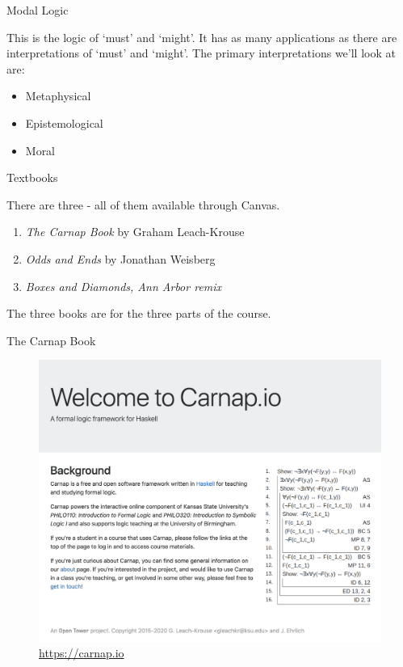 \documentclass[
  ignorenonframetext,
]{beamer}
\providecommand{\tightlist}{%
  \setlength{\itemsep}{0pt}\setlength{\parskip}{0pt}}
\renewcommand{\,}{\text{, }}
\begin{document}
\begin{frame}{Modal Logic}
\protect\hypertarget{modal-logic}{}

This is the logic of `must' and `might'. It has as many applications as
there are interpretations of `must' and `might'. The primary
interpretations we'll look at are:

\begin{itemize}[<+->]
\tightlist
\item
  Metaphysical
\item
  Epistemological\\
\item
  Moral
\end{itemize}

\end{frame}

\begin{frame}{Textbooks}
\protect\hypertarget{textbooks}{}

There are three - all of them available through Canvas.

\begin{enumerate}
\tightlist
\item
  \emph{The Carnap Book} by Graham Leach-Krouse
\item
  \emph{Odds and Ends} by Jonathan Weisberg
\item
  \emph{Boxes and Diamonds, Ann Arbor remix}
\end{enumerate}

The three books are for the three parts of the course.

\end{frame}

\begin{frame}{The Carnap Book}
\protect\hypertarget{the-carnap-book}{}

\begin{figure}
\centering
\includegraphics[width=\textwidth,height=0.8\textheight]{../images/0_1_a_Carnap.png}
\caption{\url{https://carnap.io}}
\end{figure}

\end{frame}
\end{document}
